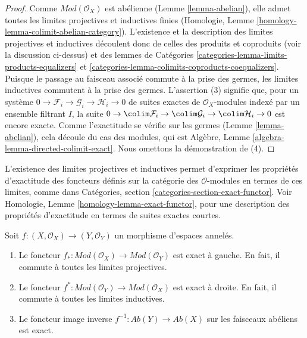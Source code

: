 \begin{proof}
Comme $\textit{Mod}(\mathcal{O}_X)$ est abélienne (Lemme
\ref{lemma-abelian}), elle admet toutes les limites projectives et inductives
finies (Homologie, Lemme \ref{homology-lemma-colimit-abelian-category}).
L'existence et la description des limites projectives et inductives découlent
donc de celles des produits et coproduits (voir la discussion ci-dessus) et
des lemmes de Catégories \ref{categories-lemma-limits-products-equalizers} et
\ref{categories-lemma-colimits-coproducts-coequalizers}. Puisque le passage au
faisceau associé commute à la prise des germes, les limites inductives
commutent à la prise des germes. L'assertion (3) signifie que, pour un système
$0 \to \mathcal{F}_i \to \mathcal{G}_i \to \mathcal{H}_i \to 0$ de suites
exactes de $\mathcal{O}_X$-modules indexé par un ensemble filtrant $I$, la
suite $0 \to \colim \mathcal{F}_i \to \colim \mathcal{G}_i \to
\colim \mathcal{H}_i \to 0$ est encore exacte. Comme l'exactitude se vérifie
sur les germes (Lemme \ref{lemma-abelian}), cela découle du cas des modules,
qui est Algèbre, Lemme \ref{algebra-lemma-directed-colimit-exact}. Nous
omettons la démonstration de (4).
\end{proof}

\noindent
L'existence des limites projectives et inductives permet d'exprimer les
propriétés d'exactitude des foncteurs définis sur la catégorie des
$\mathcal{O}$-modules en termes de ces limites, comme dans Catégories,
section \ref{categories-section-exact-functor}. Voir Homologie, Lemme
\ref{homology-lemma-exact-functor}, pour une description des propriétés
d'exactitude en termes de suites exactes courtes.

\begin{lemma}
\label{lemma-exactness-pushforward-pullback}
Soit $f : (X, \mathcal{O}_X) \to (Y, \mathcal{O}_Y)$ un morphisme
d'espaces annelés.
\begin{enumerate}
\item Le foncteur
$f_* : \textit{Mod}(\mathcal{O}_X) \to \textit{Mod}(\mathcal{O}_Y)$
est exact à gauche. En fait, il commute à toutes les limites projectives.
\item Le foncteur
$f^* : \textit{Mod}(\mathcal{O}_Y) \to \textit{Mod}(\mathcal{O}_X)$
est exact à droite. En fait, il commute à toutes les limites inductives.
\item Le foncteur image inverse
$f^{-1} : \textit{Ab}(Y) \to \textit{Ab}(X)$ sur les faisceaux abéliens est
exact.
\end{enumerate}
\end{lemma}

